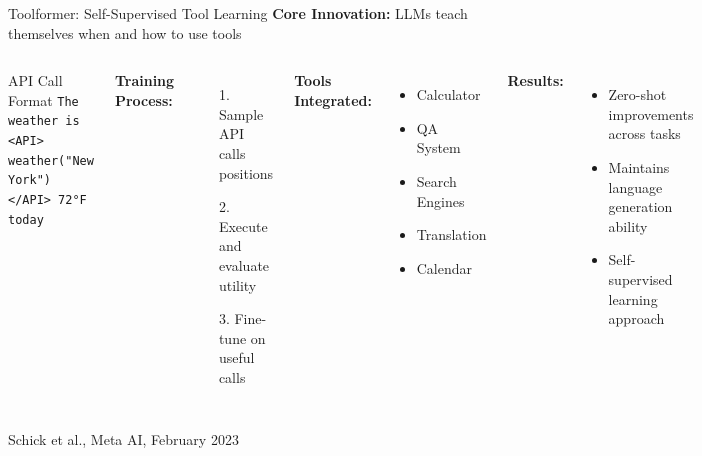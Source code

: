\documentclass[aspectratio=169]{beamer}
\begin{document}
\begin{frame}{Toolformer: Self-Supervised Tool Learning}
	\textbf{Core Innovation:} LLMs teach themselves when and how to use tools
	
	\begin{columns}
		\begin{block}{API Call Format}
			\footnotesize
			\texttt{The weather is <API>}\\
			\texttt{weather("New York")}\\
			\texttt{</API> 72°F today}
		\end{block}
		
		\textbf{Training Process:}
		\begin{itemize}
			\item[1.] Sample API calls positions
			\item[2.] Execute and evaluate utility
			\item[3.] Fine-tune on useful calls
		\end{itemize}
		
		\textbf{Tools Integrated:}
		\begin{itemize}
			\item Calculator
			\item QA System
			\item Search Engines
			\item Translation
			\item Calendar
		\end{itemize}
		
		\textbf{Results:}
		\begin{itemize}
			\item {\color{highlight}Zero-shot} improvements across tasks
			\item Maintains language generation ability
			\item Self-supervised learning approach
		\end{itemize}
	\end{columns}
	
	\vspace{0.3cm}
	\small
	Schick et al., Meta AI, February 2023
\end{frame}
\end{document}
